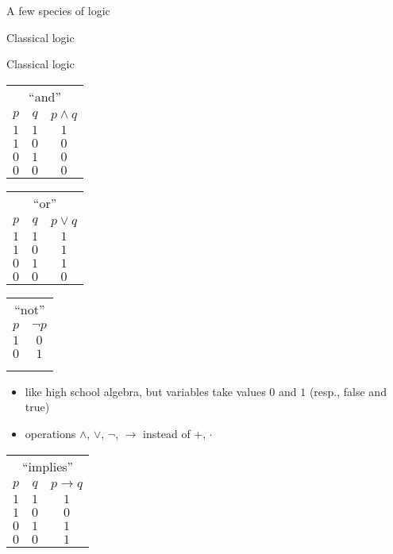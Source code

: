 \documentclass{beamer}
\newcommand{\sect}[1]{\begin{frame}\centerline{\large #1}\end{frame}}
\begin{document}
\sect{A few species of logic}

\sect{Classical logic}

\begin{frame}{Classical logic}

\begin{tabular}{cc|c}
\multicolumn{3}{c}{``and''} \\
$p$ & $q$ & $p\land q$ \\
\hline
$1$ & $1$ & $1$ \\
$1$ & $0$ & $0$ \\
$0$ & $1$ & $0$ \\
$0$ & $0$ & $0$
\end{tabular}
\hfill
\begin{tabular}{cc|c}
\multicolumn{3}{c}{``or''} \\
$p$ & $q$ & $p\lor q$ \\
\hline
$1$ & $1$ & $1$ \\
$1$ & $0$ & $1$ \\
$0$ & $1$ & $1$ \\
$0$ & $0$ & $0$
\end{tabular}
\hfill
\begin{tabular}{c|c}
\multicolumn{2}{c}{``not''} \\
$p$ & $\lnot p$ \\
\hline
$1$ & $0$ \\
$0$ & $1$ \\
\\
\\
\end{tabular}

\vfill

\begin{minipage}{.5\textwidth}
\begin{itemize}
\item like high school algebra, but variables take values $0$ and $1$
    (resp., false and true)
\item operations $\land$, $\lor$, $\lnot$, $\to$ instead of $+$, $\cdot$
\end{itemize}
\end{minipage}
\hfill
\begin{tabular}{cc|c}
\multicolumn{3}{c}{``implies''} \\
$p$ & $q$ & $p\to q$ \\
\hline
$1$ & $1$ & $1$ \\
$1$ & $0$ & $0$ \\
$0$ & $1$ & $1$ \\
$0$ & $0$ & $1$
\end{tabular}

\end{frame}
\end{document}
